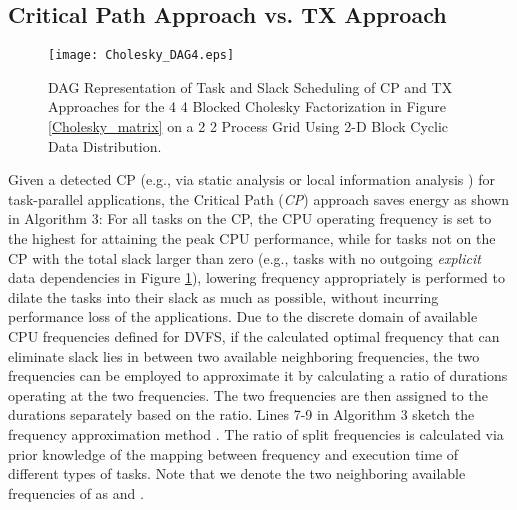 \documentclass[12pt]{elsarticle}
\begin{document}
\subsection{Critical Path Approach vs. TX Approach}

\begin{figure}\centering
\texttt{[image: Cholesky\_DAG4.eps]}\\\caption{DAG Representation of Task and Slack Scheduling of CP and TX Approaches for the 4  4 Blocked Cholesky Factorization in Figure \ref{Cholesky_matrix} on a 2  2 Process Grid Using 2-D Block Cyclic Data Distribution.}
\label{Cholesky_DAG}
\end{figure}

Given a detected CP (e.g., via static analysis \cite{ipdps05a} or local information analysis \cite{ics09}) for task-parallel applications, the Critical Path (\emph{CP}) approach saves energy as shown in Algorithm 3: For all tasks on the CP, the CPU operating frequency is set to the highest for attaining the peak CPU performance, while for tasks not on the CP with the total slack larger than zero (e.g., tasks with no outgoing \emph{explicit} data dependencies in Figure \ref{Cholesky_DAG}), lowering frequency appropriately is performed to dilate the tasks into their slack as much as possible, without incurring performance loss of the applications. Due to the discrete domain of available CPU frequencies defined for DVFS, if the calculated optimal frequency that can eliminate slack lies in between two available neighboring frequencies, the two frequencies can be employed to approximate it by calculating a ratio of durations operating at the two frequencies. The two frequencies are then assigned to the durations separately based on the ratio. Lines 7-9 in Algorithm 3 sketch the frequency approximation method \cite{tpds04} \cite{ics09}. The ratio of split frequencies is calculated via prior knowledge of the mapping between frequency and execution time of different types of tasks. Note that we denote the two neighboring available frequencies of  as  and .
\end{document}

